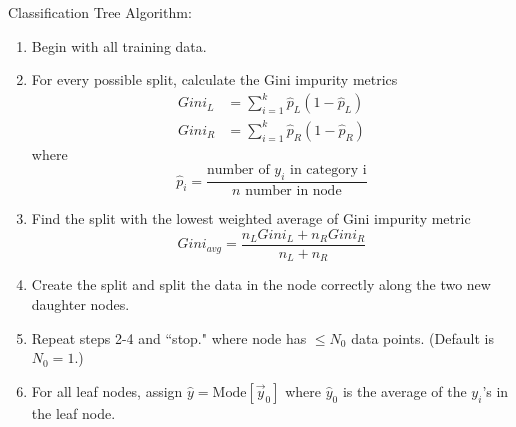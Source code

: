 \documentclass[12pt]{article}
\begin{document}
Classification Tree Algorithm: \begin{enumerate} 
\item Begin with all training data. 
\item For every possible split, calculate the Gini impurity metrics $$ \begin{aligned} Gini_L &= \sum_{i=1}^k \hat{p}_L(1 - \hat{p}_L) \\ Gini_R &= \sum_{i=1}^k \hat{p}_R(1 - \hat{p}_R) \end{aligned} $$ where $$ \hat{p}_i = \frac{\text{number of $y_i$ in category i}}{n\text{ number in node}} $$ 
\item Find the split with the lowest weighted average of Gini impurity metric $$ Gini_{avg} = \frac{n_L Gini_L + n_R Gini_R}{n_L + n_R} $$ 
\item Create the split and split the data in the node correctly along the two new daughter nodes. 
\item Repeat steps 2-4 and ``stop." where node has $\leq N_0$ data points. (Default is $N_0 = 1$.)
\item For all leaf nodes, assign $\hat{y} = \text{Mode}[\vec{y}_0]$ where $\hat{y}_0$ is the average of the $y_i$'s in the leaf node. \end{enumerate} 
\end{document}
